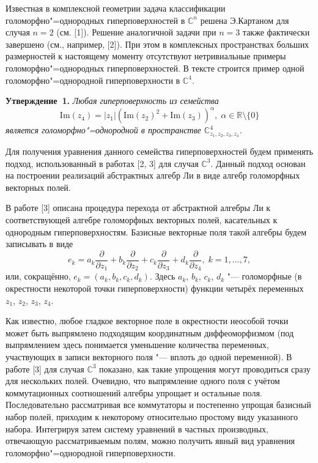 \vzmscaption

Известная в комплексной геометрии задача классификации голоморфно"=однородных гиперповерхностей в $\mathbb{C}^n$ решена Э.Картаном для случая $n = 2$ (см. [1]). Решение аналогичной задачи при $n = 3$ также фактически завершено (см., например, [2]). При этом в комплексных пространствах больших размерностей к настоящему моменту отсутствуют нетривиальные примеры голоморфно"=однородных гиперповерхностей. В тексте строится пример одной голоморфно"=однородной гиперповерхности в $\mathbb{C}^4$.

\textbf{Утверждение~1.} {\it Любая гиперповерхность из семейства
$$\mathrm{Im}(z_4) = |z_1| \left(\mathrm{Im}(z_2)^2 + \mathrm{Im}(z_3)\right)^\alpha , \; \alpha \in \mathbb{R}\setminus\{0\}$$
является голоморфно"=однородной в пространстве $\mathbb{C}^4_{z_1, z_2, z_3, z_4}$.}

Для получения уравнения данного семейства гиперповерхностей будем применять подход, использованный в работах [2, 3] для случая $\mathbb{C}^3$. Данный подход основан на построении реализаций абстрактных алгебр Ли в виде алгебр голоморфных векторных полей.

В работе [3] описана процедура перехода от абстрактной алгебры Ли к соответствующей алгебре голоморфных векторных полей, касательных к однородным гиперповерхностям. Базисные векторные поля такой алгебры будем записывать в виде
$$
e_k = a_k\frac{\partial}{\partial z_1} + b_k\frac{\partial}{\partial z_2} + c_k\frac{\partial}{\partial z_3} + d_k\frac{\partial}{\partial z_4}, \; k = 1, \ldots, 7,
$$
или, сокращённо, $e_k = \left( a_k, b_k, c_k, d_k\right)$. Здесь $a_k$, $b_k$, $c_k$, $d_k$ "--- голоморфные (в окрестности некоторой точки гиперповерхности) функции четырёх переменных $z_1$, $z_2$, $z_3$, $z_4$.

Как известно, любое гладкое векторное поле в окрестности неособой точки может быть выпрямлено подходящим координатным диффеоморфизмом (под выпрямлением здесь понимается уменьшение количества переменных, участвующих в записи векторного поля "--- вплоть до одной переменной). В работе [3] для случая $\mathbb{C}^3$ показано, как такие упрощения могут проводиться сразу для нескольких полей. Очевидно, что выпрямление одного поля с учётом коммутационных соотношений алгебры упрощает и остальные поля. Последовательно рассматривая все коммутаторы и постепенно упрощая базисный набор полей, приходим к некоторому относительно простому виду указанного набора. Интегрируя затем систему уравнений в частных производных, отвечающую рассматриваемым полям, можно получить явный вид уравнения голоморфно"=однородной гиперповерхности.

